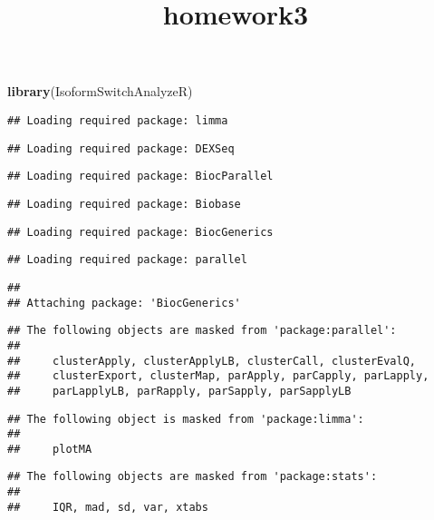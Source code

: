 \documentclass[]{article}
\title{homework3}
\author{}
\date{}
\newenvironment{Shaded}{\begin{snugshade}}{\end{snugshade}}
\newcommand{\KeywordTok}[1]{\textcolor[rgb]{0.13,0.29,0.53}{\textbf{#1}}}
\newcommand{\NormalTok}[1]{#1}
\begin{document}
\maketitle

\begin{Shaded}
\begin{Highlighting}[]
\KeywordTok{library}\NormalTok{(IsoformSwitchAnalyzeR)}
\end{Highlighting}
\end{Shaded}

\begin{verbatim}
## Loading required package: limma
\end{verbatim}

\begin{verbatim}
## Loading required package: DEXSeq
\end{verbatim}

\begin{verbatim}
## Loading required package: BiocParallel
\end{verbatim}

\begin{verbatim}
## Loading required package: Biobase
\end{verbatim}

\begin{verbatim}
## Loading required package: BiocGenerics
\end{verbatim}

\begin{verbatim}
## Loading required package: parallel
\end{verbatim}

\begin{verbatim}
## 
## Attaching package: 'BiocGenerics'
\end{verbatim}

\begin{verbatim}
## The following objects are masked from 'package:parallel':
## 
##     clusterApply, clusterApplyLB, clusterCall, clusterEvalQ,
##     clusterExport, clusterMap, parApply, parCapply, parLapply,
##     parLapplyLB, parRapply, parSapply, parSapplyLB
\end{verbatim}

\begin{verbatim}
## The following object is masked from 'package:limma':
## 
##     plotMA
\end{verbatim}

\begin{verbatim}
## The following objects are masked from 'package:stats':
## 
##     IQR, mad, sd, var, xtabs
\end{verbatim}
\end{document}

